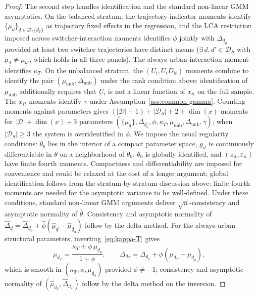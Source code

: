 \begin{proof}
The second step handles identification and the standard non-linear GMM asymptotics.
On the balanced stratum, the trajectory-indicator moments identify $\{\mu_{\underline d}\}_{\underline d\in\mathcal D\setminus\{d_T\}}$ as trajectory fixed effects in the regression, and the LCA restriction imposed across switcher-interaction moments identifies $\phi$ jointly with $\Delta_{\underline d_0}$ provided at least two switcher trajectories have distinct means ($\exists\,\underline d,\underline d'\in\mathcal D_S$ with $\mu_{\underline d}\neq\mu_{\underline d'}$, which holds in all three panels).
The always-urban interaction moment identifies $\kappa_T$.
On the unbalanced stratum, the $(U_i,U_iD_{it})$ moments combine to identify the pair $(\mu_{\mathrm{unb}},\Delta_{\mathrm{unb}})$ under the rank condition above; identification of $\mu_{\mathrm{unb}}$ additionally requires that $U_i$ is not a linear function of $x_{it}$ on the full sample.
The $x_{it}$ moments identify $\gamma$ under Assumption~\ref{ass:common-gamma}.
Counting moments against parameters gives $(\lvert\mathcal D\rvert - 1) + \lvert\mathcal D_S\rvert + 2 + \dim(x)$ moments for $\lvert\mathcal D\rvert + \dim(x) + 3$ parameters $(\{\mu_{\underline d}\},\Delta_{\underline d_0},\phi,\kappa_T,\mu_{\mathrm{unb}},\Delta_{\mathrm{unb}},\gamma)$; when $\lvert\mathcal D_S\rvert \geq 3$ the system is overidentified in $\phi$.
We impose the usual regularity conditions: $\theta_0$ lies in the interior of a compact parameter space, $g_{it}$ is continuously differentiable in $\theta$ on a neighborhood of $\theta_0$, $\theta_0$ is globally identified, and $(z_{it},\varepsilon_{it})$ have finite fourth moments.
Compactness and differentiability are imposed for convenience and could be relaxed at the cost of a longer argument; global identification follows from the stratum-by-stratum discussion above; finite fourth moments are needed for the asymptotic variance to be well-defined.
Under these conditions, standard non-linear GMM arguments \citep{hansen1982gmm,neweyMcFadden1994} deliver $\sqrt n$-consistency and asymptotic normality of $\hat\theta$.
Consistency and asymptotic normality of $\hat\Delta_{\underline d} = \hat\Delta_{\underline d_0} + \hat\phi(\hat\mu_{\underline d}-\hat\mu_{\underline d_0})$ follow by the delta method.
For the always-urban structural parameters, inverting~\eqref{eq:kappa-T} gives
\[
\mu_{d_T} = \frac{\kappa_T + \phi\,\mu_{\underline d_0}}{1+\phi}, \qquad \Delta_{d_T} = \Delta_{\underline d_0} + \phi(\mu_{d_T}-\mu_{\underline d_0}),
\]
which is smooth in $(\kappa_T,\phi,\mu_{\underline d_0})$ provided $\phi\neq -1$; consistency and asymptotic normality of $(\hat\mu_{d_T},\hat\Delta_{d_T})$ follow by the delta method on the inversion.


\end{proof}
